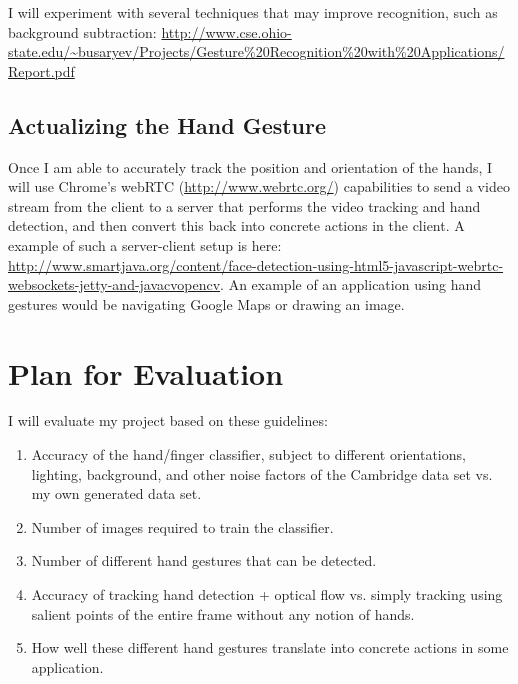\documentclass[12pt]{article}
\begin{document}
I will experiment with several techniques that may improve recognition, such as background subtraction: \url{http://www.cse.ohio-state.edu/~busaryev/Projects/Gesture\%20Recognition\%20with\%20Applications/Report.pdf}

\subsection{Actualizing the Hand Gesture}

Once I am able to accurately track the position and orientation of the hands, I will use Chrome's webRTC (\url{http://www.webrtc.org/}) capabilities to send a video stream from the client to a server that performs the video tracking and hand detection, and then convert this back into concrete actions in the client. A example of such a server-client setup is here: \url{http://www.smartjava.org/content/face-detection-using-html5-javascript-webrtc-websockets-jetty-and-javacvopencv}. An example of an application using hand gestures would be navigating Google Maps or drawing an image.

\section{Plan for Evaluation}
I will evaluate my project based on these guidelines:
\begin{enumerate}
\item Accuracy of the hand/finger classifier, subject to different orientations, lighting, background, and other noise factors of the Cambridge data set vs. my own generated data set.
\item Number of images required to train the classifier.
\item Number of different hand gestures that can be detected.
\item Accuracy of tracking hand detection + optical flow vs. simply tracking using salient points of the entire frame without any notion of hands.
\item How well these different hand gestures translate into concrete actions in some application.
\end{enumerate}
\end{document}

